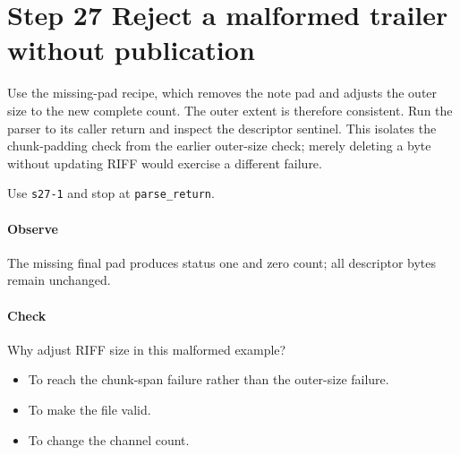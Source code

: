 \section{Step 27 Reject a malformed trailer without publication}\label{pcm-wav-s27}
Use the missing-pad recipe, which removes the note pad and adjusts the outer size to the new complete count. The outer extent is therefore consistent. Run the parser to its caller return and inspect the descriptor sentinel. This isolates the chunk-padding check from the earlier outer-size check; merely deleting a byte without updating RIFF would exercise a different failure.

Use \texttt{s27-1} and stop at \texttt{parse\_return}.

\paragraph{Observe} The missing final pad produces status one and zero count; all descriptor bytes remain unchanged.

\paragraph{Check} Why adjust RIFF size in this malformed example?
\begin{itemize}
  \item[A.] To reach the chunk-span failure rather than the outer-size failure.
  \item[B.] To make the file valid.
  \item[C.] To change the channel count.
\end{itemize}
